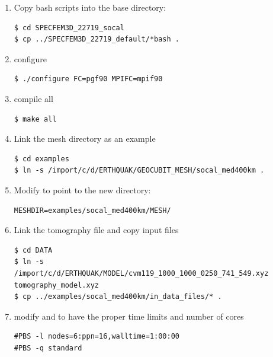 \documentclass[10pt,fleqn,letterpaper]{article}
\begin{document}
\begin{enumerate}
\item Copy bash scripts into the base directory:

\begin{lstlisting}
$ cd SPECFEM3D_22719_socal
$ cp ../SPECFEM3D_22719_default/*bash .
\end{lstlisting}

\item configure
\begin{lstlisting}
$ ./configure FC=pgf90 MPIFC=mpif90
\end{lstlisting}

\item compile all
\begin{lstlisting}
$ make all
\end{lstlisting}

\item Link the mesh directory as an example
\begin{lstlisting}
$ cd examples
$ ln -s /import/c/d/ERTHQUAK/GEOCUBIT_MESH/socal_med400km .
\end{lstlisting}

\item Modify  to point to the new directory:
\begin{lstlisting}
MESHDIR=examples/socal_med400km/MESH/
\end{lstlisting}

\item Link the tomography file and copy input files
\begin{lstlisting}
$ cd DATA
$ ln -s /import/c/d/ERTHQUAK/MODEL/cvm119_1000_1000_0250_741_549.xyz tomography_model.xyz
$ cp ../examples/socal_med400km/in_data_files/* .
\end{lstlisting}

\item modify  and  to have the proper time limits and number of cores
\begin{lstlisting}
#PBS -l nodes=6:ppn=16,walltime=1:00:00
#PBS -q standard
\end{lstlisting}

%
%


\end{enumerate}
\end{document}
